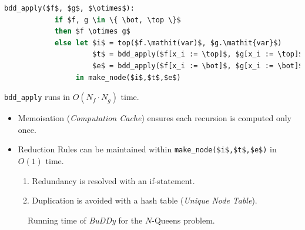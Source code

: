 \documentclass[english, aspectratio=169]{beamer}
\begin{document}
\begin{frame}[fragile]
  \begin{lstlisting}[numbers=none, language=sml]
          bdd_apply($f$, $g$, $\otimes$):
            if $f, g \in \{ \bot, \top \}$
            then $f \otimes g$
            else let $i$ = top($f.\mathit(var)$, $g.\mathit{var}$)
                     $t$ = bdd_apply($f[x_i := \top]$, $g[x_i := \top]$, $\otimes$)
                     $e$ = bdd_apply($f[x_i := \bot]$, $g[x_i := \bot]$, $\otimes$)
                 in make_node($i$,$t$,$e$)
  \end{lstlisting}

  \pause
  \begin{theorem}
    \lstinline{bdd_apply} runs in $O(N_f \cdot N_g)$ time.
  \end{theorem}
  \begin{itemize}
  \item Memoisation (\emph{Computation Cache}) ensures each recursion is
    computed only once.

  \item Reduction Rules can be maintained within
    \lstinline{make_node($i$,$t$,$e$)} in $O(1)$ time.
    \begin{enumerate}
    \item Redundancy is resolved with an if-statement.
    \item Duplication is avoided with a hash table (\emph{Unique Node Table}).
    \end{enumerate}
  \end{itemize}
\end{frame}

\begin{frame}
  \begin{figure}
    \centering


    \caption{Running time of \emph{BuDDy} for the $N$-Queens problem.}
  \end{figure}

\end{frame}
\end{document}
